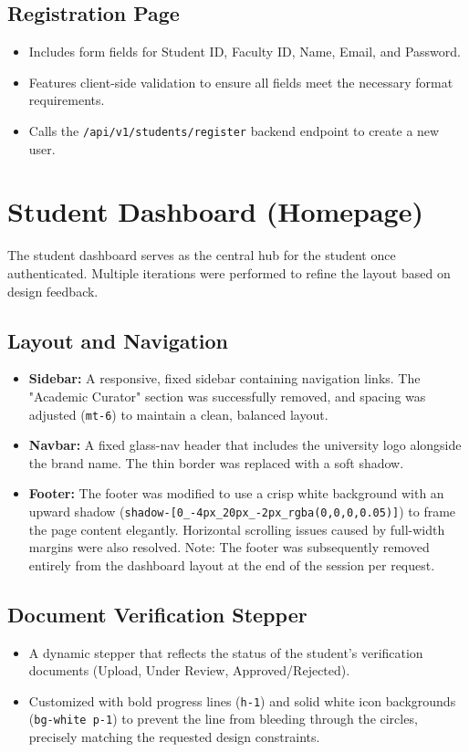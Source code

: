 \documentclass[12pt,a4paper]{article}
\begin{document}
\subsection{Registration Page}
\begin{itemize}[noitemsep]
    \item Includes form fields for Student ID, Faculty ID, Name, Email, and Password.
    \item Features client-side validation to ensure all fields meet the necessary format requirements.
    \item Calls the \texttt{/api/v1/students/register} backend endpoint to create a new user.
\end{itemize}

\section{Student Dashboard (Homepage)}
The student dashboard serves as the central hub for the student once authenticated. Multiple iterations were performed to refine the layout based on design feedback.

\subsection{Layout and Navigation}
\begin{itemize}[noitemsep]
    \item \textbf{Sidebar:} A responsive, fixed sidebar containing navigation links. The "Academic Curator" section was successfully removed, and spacing was adjusted (\texttt{mt-6}) to maintain a clean, balanced layout.
    \item \textbf{Navbar:} A fixed glass-nav header that includes the university logo alongside the brand name. The thin border was replaced with a soft shadow.
    \item \textbf{Footer:} The footer was modified to use a crisp white background with an upward shadow (\texttt{shadow-[0\_-4px\_20px\_-2px\_rgba(0,0,0,0.05)]}) to frame the page content elegantly. Horizontal scrolling issues caused by full-width margins were also resolved. Note: The footer was subsequently removed entirely from the dashboard layout at the end of the session per request.
\end{itemize}

\subsection{Document Verification Stepper}
\begin{itemize}[noitemsep]
    \item A dynamic stepper that reflects the status of the student's verification documents (Upload, Under Review, Approved/Rejected).
    \item Customized with bold progress lines (\texttt{h-1}) and solid white icon backgrounds (\texttt{bg-white p-1}) to prevent the line from bleeding through the circles, precisely matching the requested design constraints.
\end{itemize}
\end{document}
